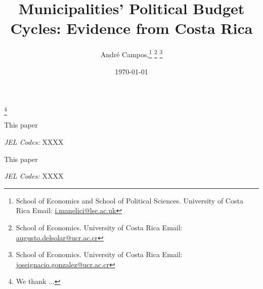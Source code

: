 \documentclass[12pt,a4paper]{article}
\begin{document}
\title{\huge{Municipalities' Political Budget Cycles: Evidence from Costa Rica}}\thanks{\footnotesize We thank ...}

\author{\large \vspace{0.5cm} André Campos,\thanks{School of Economics and School of Political Sciences. University of Costa Rica Email: \href{mailto:i.manelici@lse.ac.uk}{i.manelici@lse.ac.uk}}
	\thanks{School of Economics. University of Costa Rica Email: \href{mailto:augusto.delsolar@ucr.ac.cr}{augusto.delsolar@ucr.ac.cr}}
	\thanks{School of Economics. University of Costa Rica Email: \href{mailto:joseignacio.gonzalez@ucr.ac.cr}{joseignacio.gonzalez@ucr.ac.cr}}
}
\renewcommand\Authands{ and }
\date{\today}
	\onehalfspacing
	\setlength{\parindent}{1cm}
	\clearpage\maketitle
	\thispagestyle{empty}
	\setcounter{page}{0}
	\maketitle
	
	\begin{small}
		\onehalfspacing
		\vspace{0.75cm}
		This paper 
		\vspace{20pt}
		
		\textit{JEL Codes:} XXXX
	\end{small}
	\newpage



\begin{small}
\onehalfspacing
\vspace{0.75cm}
This paper 
\vspace{20pt}

\textit{JEL Codes:} XXXX
\end{small}


\end{document}
